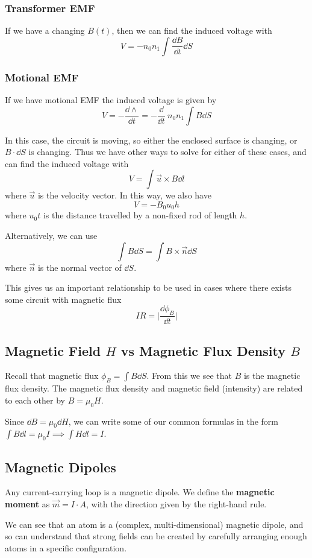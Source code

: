 \documentclass[12pt]{article}
\newcommand{\inint}[2]{\int #1 \dd #2}
\begin{document}
\subsubsection*{Transformer EMF}
If we have a changing $B(t)$, then we can find the induced voltage with \[ V = -n_0n_1 \inint{\frac{\dd B}{\dd t}}{S} \]

\subsubsection*{Motional EMF}
If we have motional EMF the induced voltage is given by \[ V = - \frac{\dd \land}{\dd t} = - \frac{\dd}{\dd t}\ n_0n_1 \inint{B}{S} \]

In this case, the circuit is moving, so either the enclosed surface is changing, or $B \cdot \dd S$ is changing. Thus we have other ways to solve for either of these cases, and can find the induced voltage with \[ V = \inint{\vec{u} \times B}{l} \] where $\vec{u}$ is the velocity vector. In this way, we also have \[ V = - B_0 u_0 h \] where $u_0 t$ is the distance travelled by a non-fixed rod of length $h$.

Alternatively, we can use \[ \inint{B}{S} = \inint{B \times \vec{n}}{S} \] where $\vec{n}$ is the normal vector of $\dd S$.

This gives us an important relationship to be used in cases where there exists some circuit with magnetic flux \[ IR = \bigg|\frac{\dd \phi_B}{\dd t}\bigg| \]

\subsection*{Magnetic Field $H$ vs Magnetic Flux Density $B$}
Recall that magnetic flux $\phi_B = \inint{B}{S}$. From this we see that $B$ is the magnetic flux density. The magnetic flux density and magnetic field (intensity) are related to each other by $B = \mu_0 H$.

Since $\dd B = \mu_0 \dd H$, we can write some of our common formulas in the form $\inint{B}{l} = \mu_0 I \implies \inint{H}{l} = I$.

\subsection*{Magnetic Dipoles}
Any current-carrying loop is a magnetic dipole. We define the {\bf magnetic moment} as $\vec{m} = I \cdot A$, with the direction given by the right-hand rule.

We can see that an atom is a (complex, multi-dimensional) magnetic dipole, and so can understand that strong fields can be created by carefully arranging enough atoms in a specific configuration.
\end{document}
